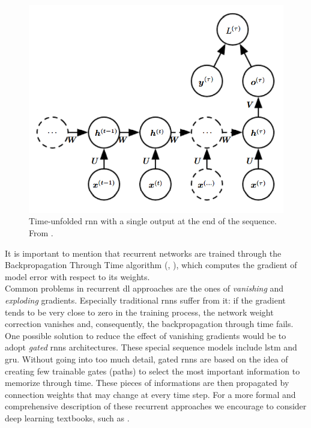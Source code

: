 \begin{figure}[H]
	\begin{center}
		\includegraphics[scale=.75]{img/rnn_single_output.png}
		\captionsetup{margin=2cm}
		\caption{Time-unfolded \gls{rnn} with a single output at the end of the sequence. From \cite{goodfellow2016deep}.}
		\label{fig:rnn_single_output}
	\end{center}
\end{figure}
\noindent It is important to mention that recurrent networks are trained through the Backpropagation Through Time algorithm (\cite{rumelhart1985learning}, \cite{werbos1990backpropagation}), which computes the gradient of model error with respect to its weights. \\
Common problems in recurrent \gls{dl} approaches are the ones of \textit{vanishing} and \textit{exploding} gradients. Especially traditional \gls{rnn}s suffer from it: if the gradient tends to be very close to zero in the training process, the network weight correction vanishes and, consequently, the backpropagation through time fails. \\
One possible solution to reduce the effect of vanishing gradients would be to adopt \textit{gated} \gls{rnn}s architectures. These special sequence models include \gls{lstm}\cite{hochreiter1997long} and \gls{gru}\cite{chung2014empirical}. Without going into too much detail, gated \gls{rnn}s are based on the idea of creating few trainable gates (paths) to select the most important information to memorize through time. These pieces of informations are then propagated by connection weights that may change at every time step. For a more formal and comprehensive description of these recurrent approaches we encourage to consider deep learning textbooks, such as \cite{goodfellow2016deep}. 
